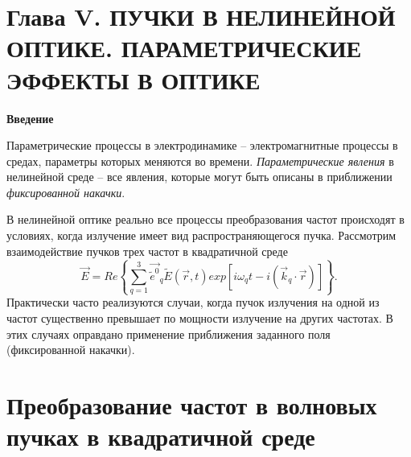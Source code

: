 \documentclass[a4paper]{article}
\begin{document}
\newpage
\setcounter{section}{0}
\setcounter{equation}{0}
\section*{Глава V. ПУЧКИ В НЕЛИНЕЙНОЙ ОПТИКЕ. ПАРАМЕТРИЧЕСКИЕ ЭФФЕКТЫ В ОПТИКЕ}
\textbf{Введение}

Параметрические процессы в электродинамике -- электромагнитные процессы в средах, параметры которых меняются во времени. \textit{Параметрические явления} в нелинейной среде – все явления, которые могут быть описаны в приближении \textit{фиксированной накачки}. 

В нелинейной оптике реально все процессы преобразования частот происходят в условиях, когда излучение имеет вид распространяющегося пучка. Рассмотрим взаимодействие пучков трех частот в квадратичной среде 
$$\vec{E}=Re\left\{\sum_{q=1}^{3}\vec{\tilde{e}^{0}}_{q}\tilde{E}(\vec{r},t)exp\left[i\omega_{q}t-i\left(\vec{k}_{q}\cdot\vec{r}\right)\right]\right\}.$$
Практически часто реализуются случаи, когда пучок излучения на одной из частот существенно превышает по мощности излучение на других частотах. В этих случаях оправдано применение приближения заданного поля (фиксированной накачки).

\section{Преобразование частот в волновых пучках в квадратичной среде}
\end{document}
